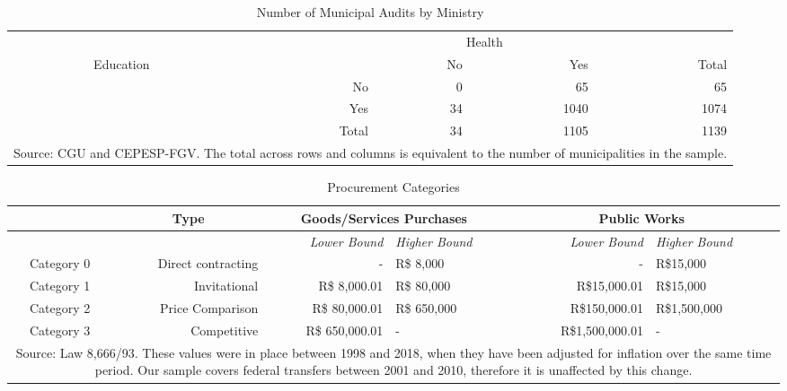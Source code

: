 \documentclass[11pt]{article}
\newcommand\T{\rule{0pt}{2.6ex}}       %
\newcommand\B{\rule[-1.2ex]{0pt}{0pt}} %
\begin{document}
\begin{table}[!htbp]
  \caption{\label{tab:auditbyministry}Number of Municipal Audits by Ministry}
  \centering
  \small
  \begin{tabular}{crrrr}
    \hline

    \hline
    & \multicolumn{4}{c}{\parbox{.25\textwidth}{\centering Health}} \T \B \\
    \multicolumn{1}{c}{\multirow{4}{*}{\parbox[c][][c]{.15\textwidth}{\centering Education}}} & \multicolumn{1}{l}{} & No & Yes & Total \T \B \\
                         \cline{2-5}
    \multicolumn{1}{c}{} & No    & 0  & 65   & 65   \T \B \\
    \multicolumn{1}{c}{} & Yes   & 34 & 1040 & 1074 \T \B \\
                         \cline{2-5}
    \multicolumn{1}{c}{} & Total & 34 & 1105 & 1139 \T \B \\
    \hline

    \hline
    \multicolumn{5}{p{.43\textwidth}}{\footnotesize Source: CGU and CEPESP-FGV. The total across rows and columns is equivalent to the number of municipalities in the sample.} \T
  \end{tabular}
\end{table}

\begin{table}[!htbp]
  \caption{\label{tab:procurementtypes} Procurement Categories}
  \centering

  \small
  \begin{tabular}{crrlrl}
  \hline

  \hline
  & \multicolumn{1}{c}{Type} & \multicolumn{2}{c}{Goods/Services Purchases} & \multicolumn{2}{c}{Public Works} \T \B    \\
  \hline
             &                    & \emph{Lower Bound} & \emph{Higher Bound} & \emph{Lower Bound} & \emph{Higher Bound} \T \B \\
  \hline
  Category 0 & Direct contracting & -                  & R\$ 8,000           & -                  & R\$15,000           \T \B \\
  Category 1 & Invitational       & R\$ 8,000.01       & R\$ 80,000          & R\$15,000.01       & R\$15,000           \T \B \\
  Category 2 & Price Comparison   & R\$ 80,000.01      & R\$ 650,000         & R\$150,000.01      & R\$1,500,000        \T \B \\
  Category 3 & Competitive        & R\$ 650,000.01     & -                   & R\$1,500,000.01    & -                   \T \B \\
  \hline

  \hline
  \multicolumn{6}{p{.94\textwidth}}{\footnotesize Source: Law 8,666/93. These values were in place between 1998 and 2018, when they have been adjusted for inflation over the same time period. Our sample covers federal transfers between 2001 and 2010, therefore it is unaffected by this change.} \T
  \end{tabular}
\end{table}
\end{document}
